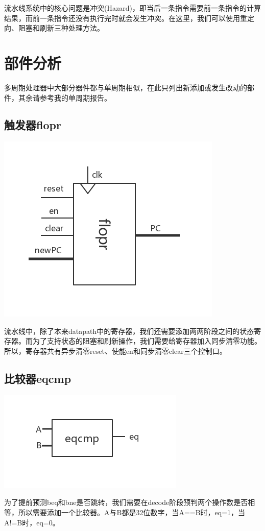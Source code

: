 \documentclass[12pt]{article} %
\begin{document}
\begin{sloppypar}
流水线系统中的核心问题是冲突(Hazard)，即当后一条指令需要前一条指令的计算结果，而前一条指令还没有执行完时就会发生冲突。在这里，我们可以使用重定向、阻塞和刷新三种处理方法。

\newpage
\section{部件分析}

多周期处理器中大部分器件都与单周期相似，在此只列出新添加或发生改动的部件，其余请参考我的单周期报告。

\subsection{触发器flopr}

\includegraphics[width =0.35\linewidth]{figure/flopr.jpg}

流水线中，除了本来datapath中的寄存器，我们还需要添加两两阶段之间的状态寄存器。而为了支持状态的阻塞和刷新操作，我们需要给寄存器加入同步清零功能。所以，寄存器共有异步清零reset、使能en和同步清零clear三个控制口。

\subsection{比较器eqcmp}

\includegraphics[width =0.3\linewidth]{figure/eqcmp.jpg}

为了提前预测beq和bne是否跳转，我们需要在decode阶段预判两个操作数是否相等，所以需要添加一个比较器。A与B都是32位数字，当A==B时，eq=1，当A!=B时，eq=0。



\end{sloppypar}
\end{document}

